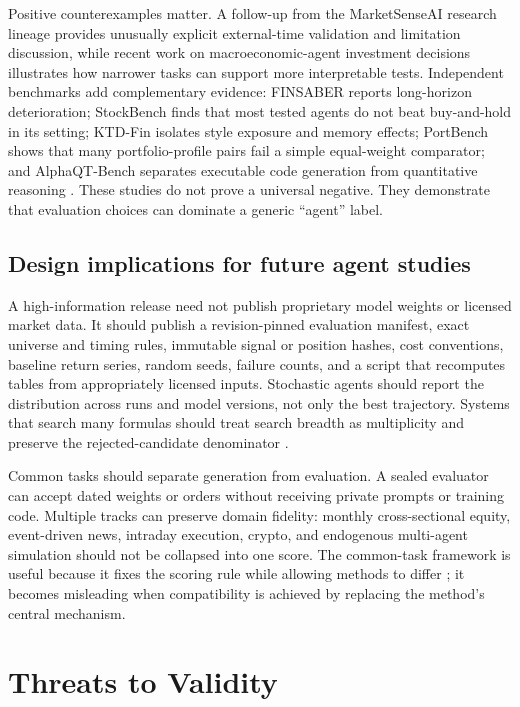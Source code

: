 \documentclass[11pt]{article}
\begin{document}
Positive counterexamples matter. A follow-up from the MarketSenseAI research lineage provides unusually explicit external-time validation and limitation discussion, while recent work on macroeconomic-agent investment decisions illustrates how narrower tasks can support more interpretable tests. Independent benchmarks add complementary evidence: FINSABER reports long-horizon deterioration; StockBench finds that most tested agents do not beat buy-and-hold in its setting; KTD-Fin isolates style exposure and memory effects; PortBench shows that many portfolio-profile pairs fail a simple equal-weight comparator; and AlphaQT-Bench separates executable code generation from quantitative reasoning \citep{FatourosMetaxas2026SignalOrNoise,LiEtAl2026FINSABER,ChenEtAl2025StockBench,ZhuEtAl2026KTDFin,ZhaoChenSu2026PortBench,LuoEtAl2026AlphaQT}. These studies do not prove a universal negative. They demonstrate that evaluation choices can dominate a generic ``agent'' label.

\subsection{Design implications for future agent studies}

A high-information release need not publish proprietary model weights or licensed market data. It should publish a revision-pinned evaluation manifest, exact universe and timing rules, immutable signal or position hashes, cost conventions, baseline return series, random seeds, failure counts, and a script that recomputes tables from appropriately licensed inputs. Stochastic agents should report the distribution across runs and model versions, not only the best trajectory. Systems that search many formulas should treat search breadth as multiplicity and preserve the rejected-candidate denominator \citep{HarveyLiuZhu2016}.

Common tasks should separate generation from evaluation. A sealed evaluator can accept dated weights or orders without receiving private prompts or training code. Multiple tracks can preserve domain fidelity: monthly cross-sectional equity, event-driven news, intraday execution, crypto, and endogenous multi-agent simulation should not be collapsed into one score. The common-task framework is useful because it fixes the scoring rule while allowing methods to differ \citep{HellumEtAl2025CommonTask}; it becomes misleading when compatibility is achieved by replacing the method's central mechanism.

\section{Threats to Validity}\label{sec:limitations}
\end{document}
